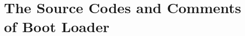 \documentclass{swfcthesis}
\begin{document}
\section{The Source Codes and Comments of Boot Loader}
\label{sec:source-codes-comm}

\inputminted[linenos=true]{nasm}{/home/pqy/Thesis/ipl10.nas}



\Appendix{}
\printbibliography[heading={bibintoc},title={参考文献}] %
\advisorinfopage{}                 %
\acknowledgmentspage{}             %






\end{document}
